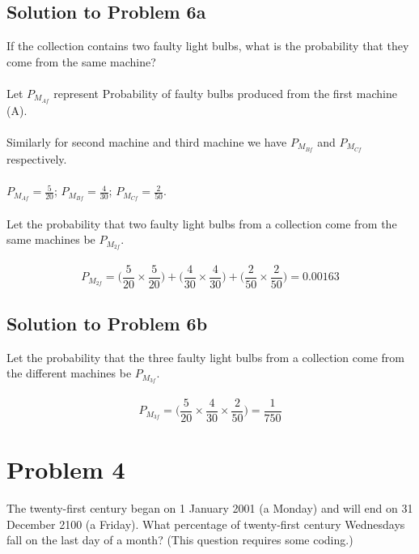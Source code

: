 \documentclass{article}
\begin{document}
\subsection{Solution to Problem 6a}
If the collection contains two faulty light bulbs, what is the probability that they come from the same machine? \\\\
Let $P_{M_{Af}}$ represent Probability of faulty bulbs produced from the first machine (A). \\ \\
Similarly for second machine and third machine we have $P_{M_{Bf}}$ and $P_{M_{Cf}}$ respectively. \\ \\
$P_{M_{Af}} = \frac{5}{20}$; \enspace $P_{M_{Bf}} = \frac{4}{30}$; \enspace $P_{M_{Cf}} = \frac{2}{50}$. \\ \\

Let the probability that two faulty light bulbs from a collection come from the same machines be $P_{M_{2f}}$. \\\\
$$P_{M_{2f}} = \Big( \frac{5}{20} \times \frac{5}{20}\Big) + \Big( \frac{4}{30} \times \frac{4}{30}\Big) + \Big( \frac{2}{50} \times \frac{2}{50}\Big) = 0.00163$$

\subsection{Solution to Problem 6b}
Let the probability that the three faulty light bulbs from a collection come from the different machines be $P_{M_{3f}}$. \\\\
$$P_{M_{3f}} = \Big( \frac{5}{20} \times \frac{4}{30} \times \frac{2}{50} \Big) = \frac{1}{750}$$

\section{Problem 4}
The twenty-first century began on 1 January 2001 (a Monday) and will end on 31 December 2100 (a Friday). What percentage of twenty-first century Wednesdays fall on the last day of a month? (This question requires some coding.)
\end{document}
